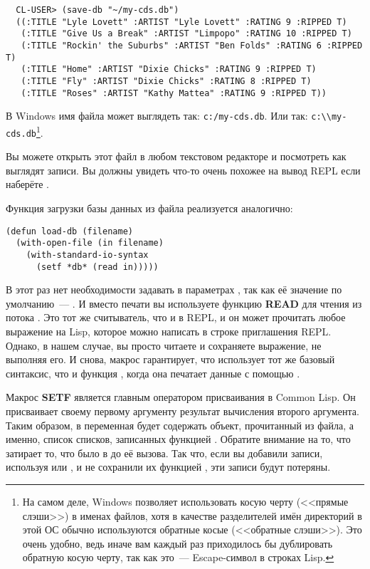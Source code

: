 \begin{verbatim}
  CL-USER> (save-db "~/my-cds.db")
  ((:TITLE "Lyle Lovett" :ARTIST "Lyle Lovett" :RATING 9 :RIPPED T)
   (:TITLE "Give Us a Break" :ARTIST "Limpopo" :RATING 10 :RIPPED T)
   (:TITLE "Rockin' the Suburbs" :ARTIST "Ben Folds" :RATING 6 :RIPPED T)
   (:TITLE "Home" :ARTIST "Dixie Chicks" :RATING 9 :RIPPED T)
   (:TITLE "Fly" :ARTIST "Dixie Chicks" :RATING 8 :RIPPED T)
   (:TITLE "Roses" :ARTIST "Kathy Mattea" :RATING 9 :RIPPED T))
\end{verbatim}

В Windows имя файла может выглядеть так: \lstinline!c:/my-cds.db!. Или так:
\lstinline!c:\\my-cds.db!\footnote{На самом деле, Windows позволяет использовать косую
  черту (<<прямые слэши>>) в именах файлов, хотя в качестве разделителей имён директорий в
  этой ОС обычно используются обратные косые (<<обратные слэши>>). Это очень удобно, ведь
  иначе вам каждый раз приходилось бы дублировать обратную косую черту, так как это~---
  Escape-символ в строках Lisp.}.

Вы можете открыть этот файл в любом текстовом редакторе и посмотреть как выглядят
записи. Вы должны увидеть что-то очень похожее на вывод REPL если наберёте .

Функция загрузки базы данных из файла реализуется аналогично:

\begin{lstlisting}
(defun load-db (filename)
  (with-open-file (in filename)
    (with-standard-io-syntax
      (setf *db* (read in)))))
\end{lstlisting}

В этот раз нет необходимости задавать  в параметрах
, так как её значение по умолчанию~--- . И вместо печати
вы используете функцию \textbf{READ} для чтения из потока . Это тот же
считыватель, что и в REPL, и он может прочитать любое выражение на Lisp, которое можно
написать в строке приглашения REPL. Однако, в нашем случае, вы просто читаете и сохраняете
выражение, не выполняя его. И снова, макрос  гарантирует,
что  использует тот же базовый синтаксис, что и функция , когда
она печатает данные с помощью .

Макрос \textbf{SETF} является главным оператором присваивания в Common Lisp. Он
присваивает своему первому аргументу результат вычисления второго аргумента. Таким образом,
в  переменная  будет содержать объект, прочитанный из файла, а
именно, список списков, записанных функцией . Обратите внимание на то, что
 затирает то, что было в  до её вызова. Так что, если вы добавили
записи, используя  или , и не сохранили их функцией
, эти записи будут потеряны.

